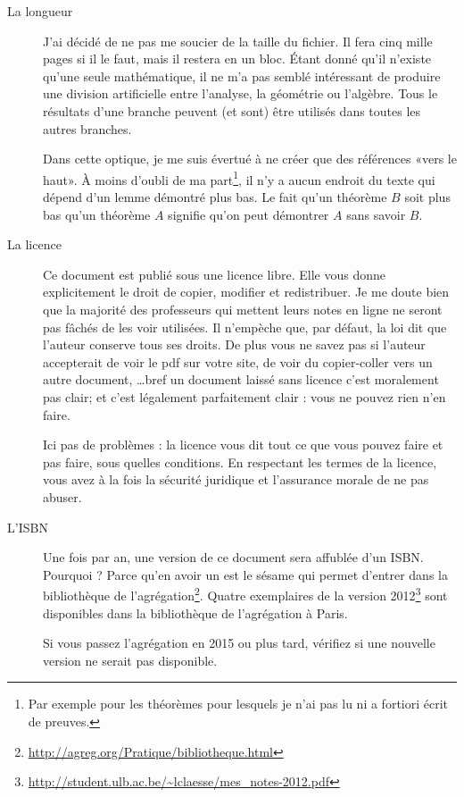 \begin{description}
    \item[La longueur] J'ai décidé de ne pas me soucier de la taille du fichier. Il fera cinq mille pages si il le faut, mais il restera en un bloc. Étant donné qu'il n'existe qu'une seule mathématique, il ne m'a pas semblé intéressant de produire une division artificielle entre l'analyse, la géométrie ou l'algèbre. Tous le résultats d'une branche peuvent (et sont) être utilisés dans toutes les autres branches.

        Dans cette optique, je me suis évertué à ne créer que des références «vers le haut». À moins d'oubli de ma part\footnote{Par exemple pour les théorèmes pour lesquels je n'ai pas lu ni a fortiori écrit de preuves.}, il n'y a aucun endroit du texte qui dépend d'un lemme démontré plus bas. Le fait qu'un théorème \( B\) soit plus bas qu'un théorème \( A\) signifie qu'on peut démontrer \( A\) sans savoir \( B\).

    \item[La licence] Ce document est publié sous une licence libre. Elle vous donne explicitement le droit de copier, modifier et redistribuer. Je me doute bien que la majorité des professeurs qui mettent leurs notes en ligne ne seront pas fâchés de les voir utilisées. Il n'empèche que, par défaut, la loi dit que l'auteur conserve tous ses droits. De plus vous ne savez pas si l'auteur accepterait de voir le pdf sur votre site, de voir du copier-coller vers un autre document, \ldots bref un document laissé sans licence c'est moralement pas clair; et c'est légalement parfaitement clair : vous ne pouvez rien n'en faire. 

        Ici pas de problèmes : la licence vous dit tout ce que vous pouvez faire et pas faire, sous quelles conditions. En respectant les termes de la licence, vous avez à la fois la sécurité juridique et l'assurance morale de ne pas abuser.
    \item[L'ISBN] Une fois par an, une version de ce document sera affublée d'un ISBN. Pourquoi ? Parce qu'en avoir un est le sésame qui permet d'entrer dans la bibliothèque de l'agrégation\footnote{\url{http://agreg.org/Pratique/bibliotheque.html}}. Quatre exemplaires de la version 2012\footnote{\url{http://student.ulb.ac.be/~lclaesse/mes_notes-2012.pdf}} sont disponibles dans la bibliothèque de l'agrégation à Paris.

        Si vous passez l'agrégation en 2015 ou plus tard, vérifiez si une nouvelle version ne serait pas disponible.
        
\end{description}

